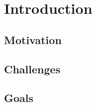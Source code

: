 \chapter{Introduction}
\label{cha:Introduction}

\section{Motivation}

\section{Challenges}

\section{Goals}
